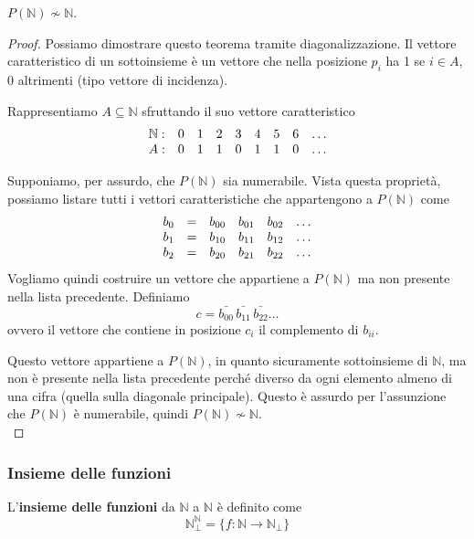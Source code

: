 \begin{theor}
	$P(\mathbb{N}) \nsim \mathbb{N}$.
\end{theor}
\begin{proof}
	Possiamo dimostrare questo teorema tramite diagonalizzazione. Il vettore caratteristico di un sottoinsieme è un vettore che nella posizione $p_i$ ha 1 se $i \in A$, 0 altrimenti (tipo vettore di incidenza).
	
	Rappresentiamo $A \subseteq \mathbb{N}$ sfruttando il suo vettore caratteristico
	$$ \begin{array}{c c c c c c c c c}
		\mathbb{N}: & 0 & 1 & 2 & 3 & 4 & 5 & 6 & \dots \\
		A: & 0 & 1 & 1 & 0 & 1 & 1 & 0 & \dots \\
	\end{array}$$
	
	Supponiamo, per assurdo, che $P (\mathbb{N})$ sia numerabile. Vista questa proprietà, possiamo listare tutti i vettori caratteristiche che appartengono a $P(\mathbb{N})$ come
	$$ 
	\begin{array}{c c c c c c}
		b_0 & = & b_{00} & b_{01} & b_{02} & \dots \\
		b_1 & = & b_{10} & b_{11} & b_{12} & \dots \\
		b_2 & = & b_{20} & b_{21} & b_{22} & \dots \\
	\end{array}
	$$
	Vogliamo quindi costruire un vettore che appartiene a $P(\mathbb{N})$ ma non presente nella lista precedente. Definiamo
	$$ c = \bar{b_{00}} \, \bar{b_{11}} \, \bar{b_{22}} \dots $$
	ovvero il vettore che contiene in posizione $c_i$ il complemento di $b_{ii}$.

	Questo vettore appartiene a $P(\mathbb{N})$, in quanto sicuramente sottoinsieme di $\mathbb{N}$, ma non è presente nella lista precedente perché diverso da ogni elemento almeno di una cifra (quella sulla diagonale principale). Questo è assurdo per l'assunzione che $P(\mathbb{N})$ è numerabile, quindi $P(\mathbb{N}) \nsim \mathbb{N}$.\\
\end{proof}

\subsubsection{Insieme delle funzioni}
L'\textbf{insieme delle funzioni} da $\mathbb{N}$ a $\mathbb{N}$ è definito come
$$ \mathbb{N}^{\mathbb{N}}_\bot = \{f: \mathbb{N} \rightarrow \mathbb{N}_{\bot} \} $$

